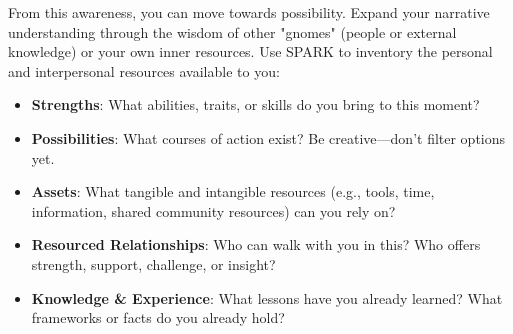 \documentclass{article}
\begin{document}
From this awareness, you can move towards possibility. Expand your narrative understanding through the wisdom of other "gnomes" (people or external knowledge) or your own inner resources. Use SPARK to inventory the personal and interpersonal resources available to you:
\begin{itemize}[noitemsep,topsep=0pt]
    \item \textbf{Strengths}: What abilities, traits, or skills do you bring to this moment?
    \item \textbf{Possibilities}: What courses of action exist? Be creative—don't filter options yet.
    \item \textbf{Assets}: What tangible and intangible resources (e.g., tools, time, information, shared community resources) can you rely on?
    \item \textbf{Resourced Relationships}: Who can walk with you in this? Who offers strength, support, challenge, or insight?
    \item \textbf{Knowledge \& Experience}: What lessons have you already learned? What frameworks or facts do you already hold?
\end{itemize}
\end{document}
